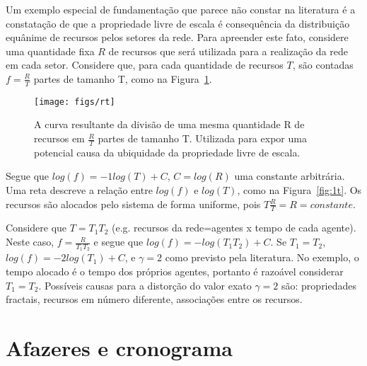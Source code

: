 \documentclass[a4paper,openright,12pt]{report} %
\begin{document}
Um exemplo especial de fundamentação que parece não 
constar na literatura é a constatação de que
a propriedade livre de escala é consequência da distribuição
equânime de recursos pelos setores da rede.
Para apreender este fato, considere uma quantidade fixa $R$ de recursos
que será utilizada para a realização da rede em cada setor.
Considere que, para cada quantidade de recursos $T$, são contadas $f=\frac{R}{T}$ partes de tamanho T, como na Figura~\ref{fig:1T}.

\begin{figure}[!h]
	\centering
	\texttt{[image: figs/rt]}
	\caption{A curva resultante da divisão de uma mesma quantidade
	R de recursos em $\frac{R}{T}$ partes de tamanho T.
        Utilizada para expor uma potencial causa da ubiquidade da
        propriedade livre de escala.}
	\label{fig:1T}
\end{figure}

Segue que $log(f)=-1 log(T) + C$, $C=log(R)$ uma constante
arbitrária. Uma reta descreve a relação entre $log(f)$ e 
$log(T)$, como na Figura~\ref{fig:1t}.
Os recursos são alocados pelo sistema de forma uniforme,
pois $T\frac{R}{T}=R=constante$.

Considere que $T=T_1 T_2$ 
(e.g. recursos da rede=agentes x tempo de cada agente). 
Neste caso,
$f=\frac{R}{T_1 T_2}$ e
segue que $log(f)=-log(T_1 T_2) +C$. Se $T_1=T_2$, 
$log(f)=-2 log(T_1) + C$, e
$\gamma=2$ como previsto pela literatura.
No exemplo, o tempo alocado
é o tempo dos próprios agentes,
portanto é razoável considerar $T_1=T_2$. 
Possíveis causas para a distorção do valor exato $\gamma=2$
são: propriedades fractais, recursos em número diferente, associações entre os recursos. 

\chapter{Afazeres e cronograma}
\end{document}
